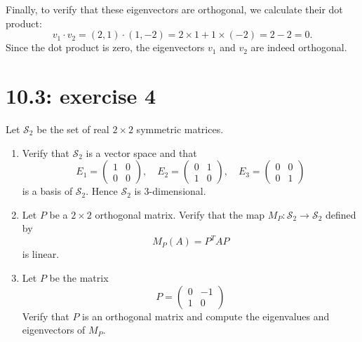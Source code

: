 \documentclass{report}
\begin{document}
Finally, to verify that these eigenvectors are orthogonal, we calculate their dot product:
\[
v_1 \cdot v_2 = (2, 1) \cdot (1, -2) = 2 \times 1 + 1 \times (-2) = 2 - 2 = 0.
\]
Since the dot product is zero, the eigenvectors \(v_1\) and \(v_2\) are indeed orthogonal.




\section*{10.3: exercise 4} 

Let \(\mathcal{S}_2\) be the set of real \(2 \times 2\) symmetric matrices.
\begin{enumerate}[label=(\alph*)]
\item Verify that \(\mathcal{S}_2\) is a vector space and that 
\begin{equation} \label{e:sym_mat_base}
E_1 = \begin{pmatrix} 1 & 0 \\ 0 & 0 \end{pmatrix}, \quad E_2 = \begin{pmatrix} 0 & 1 \\ 1 & 0 \end{pmatrix}, \quad E_3 = \begin{pmatrix} 0 & 0 \\ 0 & 1 \end{pmatrix}
\end{equation}
is a basis of \(\mathcal{S}_2\). Hence \(\mathcal{S}_2\) is 3-dimensional.
\item Let \(P\) be a \(2 \times 2\) orthogonal matrix. Verify that the map \(M_P: \mathcal{S}_2 \to \mathcal{S}_2\) defined by 
\[
M_P(A) = P^TAP
\]
is linear.
\item Let \(P\) be the matrix 
\begin{equation} \label{e:reflection_matrix}
P = \begin{pmatrix} 0 & -1 \\ 1 & 0 \end{pmatrix}
\end{equation}
Verify that \(P\) is an orthogonal matrix and compute the eigenvalues and eigenvectors of \(M_P\).
\end{enumerate}


\sol
\end{document}
